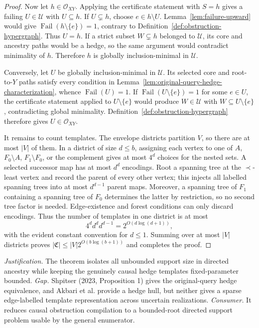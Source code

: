 \documentclass{article}
\begin{document}
\begin{proof}
Now let \(h\in\mathcal O_{XY}\).  Applying the certificate statement with \(S=h\) gives a failing \(U\in\mathscr U\) with \(U\subseteq h\).  If \(U\subsetneq h\), choose \(e\in h\setminus U\).  Lemma~\ref{lem:failure-upward} would give \(\operatorname{Fail}(h\setminus\{e\})=1\), contrary to Definition~\ref{def:obstruction-hypergraph}.  Thus \(U=h\).  If a strict subset \(W\subsetneq h\) belonged to \(\mathscr U\), its core and ancestry paths would be a hedge, so the same argument would contradict minimality of \(h\).  Therefore \(h\) is globally inclusion-minimal in \(\mathscr U\).

Conversely, let \(U\) be globally inclusion-minimal in \(\mathscr U\).  Its selected core and root-to-\(Y\) paths satisfy every condition in Lemma~\ref{lem:original-query-hedge-characterization}, whence \(\operatorname{Fail}(U)=1\).  If \(\operatorname{Fail}(U\setminus\{e\})=1\) for some \(e\in U\), the certificate statement applied to \(U\setminus\{e\}\) would produce \(W\in\mathscr U\) with \(W\subseteq U\setminus\{e\}\), contradicting global minimality.  Definition~\ref{def:obstruction-hypergraph} therefore gives \(U\in\mathcal O_{XY}\).

It remains to count templates.  The envelope districts partition \(V\), so there are at most \(|V|\) of them.  In a district of size \(d\le b\), assigning each vertex to one of \(A\), \(F_0\setminus A\), \(F_1\setminus F_0\), or the complement gives at most \(4^d\) choices for the nested sets.  A selected successor map has at most \(d^d\) encodings.  Root a spanning tree at the \(\prec\)-least vertex and record the parent of every other vertex; this injects all labelled spanning trees into at most \(d^{d-1}\) parent maps.  Moreover, a spanning tree of \(F_1\) containing a spanning tree of \(F_0\) determines the latter by restriction, so no second tree factor is needed.  Edge-existence and forest conditions can only discard encodings.  Thus the number of templates in one district is at most
\[
 4^d d^d d^{d-1}=2^{O(d\log(d+1))},
\]
with the evident constant convention for \(d\le1\).  Summing over at most \(|V|\) districts proves \(|\mathfrak C|\le |V|2^{O(b\log(b+1))}\) and completes the proof.
\end{proof}
\par\smallskip\noindent \textit{Justification.} The theorem isolates all unbounded support size in directed ancestry while keeping the genuinely causal hedge templates fixed-parameter bounded. \textit{Gap.} Shpitser (2023, Proposition 1) gives the original-query hedge equivalence, and Akbari et al. provide a hedge hull, but neither gives a sparse edge-labelled template representation across uncertain realizations. \textit{Consumer.} It reduces causal obstruction compilation to a bounded-root directed support problem usable by the general enumerator.
\end{document}
